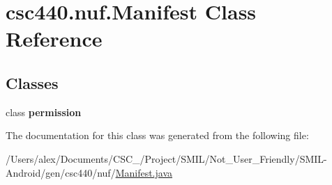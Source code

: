\hypertarget{classcsc440_1_1nuf_1_1_manifest}{\section{csc440.\-nuf.\-Manifest Class Reference}
\label{classcsc440_1_1nuf_1_1_manifest}
}
\subsection*{Classes}
\begin{DoxyCompactItemize}
\item 
class {\bfseries permission}
\end{DoxyCompactItemize}


The documentation for this class was generated from the following file\-:\begin{DoxyCompactItemize}
\item 
/\-Users/alex/\-Documents/\-C\-S\-C\-\_/\-Project/\-S\-M\-I\-L/\-Not\-\_\-\-User\-\_\-\-Friendly/\-S\-M\-I\-L-\/\-Android/gen/csc440/nuf/\hyperlink{_manifest_8java}{Manifest.\-java}\end{DoxyCompactItemize}
